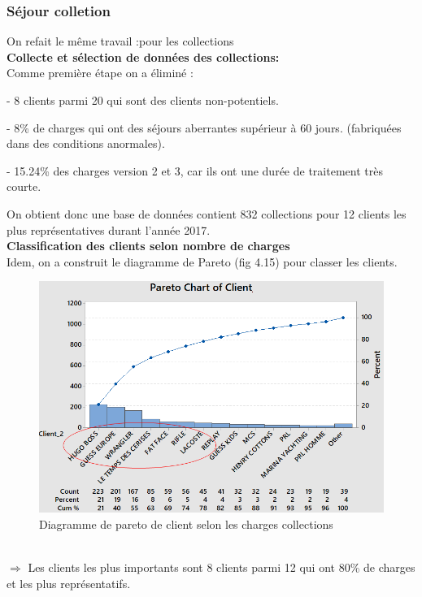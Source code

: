 \documentclass[12pt, a4paper]{thesis}
\begin{document}
\subsubsection{Séjour colletion}
On refait le même travail  :pour les collections\\
\textbf{Collecte et sélection de données des collections:}\\
Comme première étape on a éliminé :
\item - 8 clients parmi 20 qui sont des clients non-potentiels.
\item - 8\% de charges qui ont des séjours aberrantes supérieur à 60 jours. (fabriquées dans des conditions anormales).
\item - 15.24\% des charges version 2 et 3, car ils ont une durée de traitement très courte.

On obtient donc une base de données contient 832 collections pour 12 clients les plus représentatives durant l'année 2017.\\
\textbf{Classification des clients selon nombre de charges}\\
Idem, on a construit le diagramme de Pareto (fig 4.15) pour classer les clients.\\
\begin{figure}[!h]
\begin{center}
\includegraphics[scale=0.65]{parcoll.png}
\caption{Diagramme de pareto de client selon les charges collections}
\end{center}
\end{figure}\\
$\Longrightarrow$ Les clients les plus importants sont 8 clients parmi 12 qui ont 80\% de charges et les plus représentatifs.\\
\end{document}
